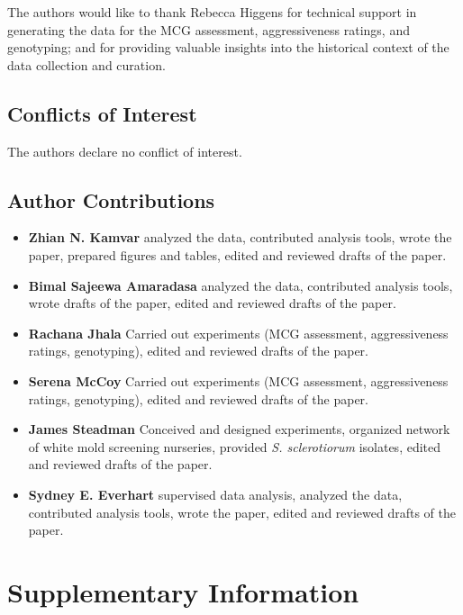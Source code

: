 \documentclass[fleqn,10pt,lineno]{wlpeerj} %
\theoremstyle{definition}
\theoremstyle{definition}
\theoremstyle{definition}
\theoremstyle{remark}
\begin{document}
The authors would like to thank Rebecca Higgens for technical support in
generating the data for the MCG assessment, aggressiveness ratings, and
genotyping; and for providing valuable insights into the historical
context of the data collection and curation.

\subsection*{Conflicts of Interest}\label{conflicts-of-interest}

The authors declare no conflict of interest.

\subsection*{Author Contributions}\label{author-contributions}

\begin{itemize}
\item
  \textbf{Zhian N. Kamvar} analyzed the data, contributed analysis
  tools, wrote the paper, prepared figures and tables, edited and
  reviewed drafts of the paper.
\item
  \textbf{Bimal Sajeewa Amaradasa} analyzed the data, contributed
  analysis tools, wrote drafts of the paper, edited and reviewed drafts
  of the paper.
\item
  \textbf{Rachana Jhala} Carried out experiments (MCG assessment,
  aggressiveness ratings, genotyping), edited and reviewed drafts of the
  paper.
\item
  \textbf{Serena McCoy} Carried out experiments (MCG assessment,
  aggressiveness ratings, genotyping), edited and reviewed drafts of the
  paper.
\item
  \textbf{James Steadman} Conceived and designed experiments, organized
  network of white mold screening nurseries, provided \emph{S.
  sclerotiorum} isolates, edited and reviewed drafts of the paper.
\item
  \textbf{Sydney E. Everhart} supervised data analysis, analyzed the
  data, contributed analysis tools, wrote the paper, edited and reviewed
  drafts of the paper.
\end{itemize}

\newpage

\section*{Supplementary Information}\label{supplementary-information}
\end{document}

